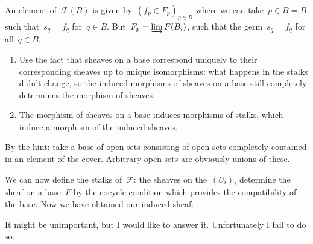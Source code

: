 \begin{exercise} %
  \label{exercise:37b}
  An element of~$\mathcal{F}(B)$ is given by~$(f_p\in F_p)_{p\in B}$ where we can take~$p\in B=B$ such that~$s_q=f_q$ for~$q\in B$. But~$F_p=\varinjlim F(B_i)$, such that the germ~$s_q=f_q$ for all~$q\in B$.
\end{exercise}

\begin{exercise}
  \begin{enumerate}
    \item Use the fact that sheaves on a base correspond uniquely to their corresponding sheaves up to unique isomorphisms: what happens in the stalks didn't change, so the induced morphisms of sheaves on a base still completely determines the morphism of sheaves.

    \item The morphism of sheaves on a base induces morphisms of stalks, which induce a morphism of the induced sheaves.
  \end{enumerate}
\end{exercise}

\begin{exercise}
  By the hint: take a base of open sets consisting of open sets completely contained in an element of the cover. Arbitrary open sets are obviously unions of these.

  We can now define the stalks of~$\mathcal{F}$: the sheaves on the~$(U_i)_i$ determine the sheaf on a base~$F$ by the cocycle condition which provides the compatibility of the base. Now we have obtained our induced sheaf.
\end{exercise}

\begin{exercise} %
  It might be unimportant, but I would like to answer it. Unfortunately I fail to do so.
\end{exercise}
